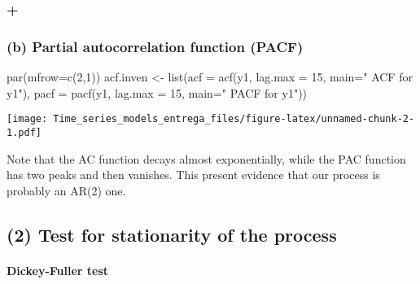 \documentclass[]{article}
\newenvironment{Shaded}{\begin{snugshade}}{\end{snugshade}}
\newcommand{\AttributeTok}[1]{\textcolor[rgb]{0.77,0.63,0.00}{#1}}
\newcommand{\DecValTok}[1]{\textcolor[rgb]{0.00,0.00,0.81}{#1}}
\newcommand{\FunctionTok}[1]{\textcolor[rgb]{0.00,0.00,0.00}{#1}}
\newcommand{\NormalTok}[1]{#1}
\newcommand{\OtherTok}[1]{\textcolor[rgb]{0.56,0.35,0.01}{#1}}
\newcommand{\StringTok}[1]{\textcolor[rgb]{0.31,0.60,0.02}{#1}}
\let\oldparagraph\paragraph
\renewcommand{\paragraph}[1]{\oldparagraph{#1}\mbox{}}
\begin{document}
\hypertarget{section}{%
\subsubsection{+}\label{section}}

\hypertarget{b-partial-autocorrelation-function-pacf}{%
\subsubsection{\texorpdfstring{\textbf{(b)} Partial autocorrelation
function
(PACF)}{(b) Partial autocorrelation function (PACF)}}\label{b-partial-autocorrelation-function-pacf}}

\begin{Shaded}
\begin{Highlighting}[]
\FunctionTok{par}\NormalTok{(}\AttributeTok{mfrow=}\FunctionTok{c}\NormalTok{(}\DecValTok{2}\NormalTok{,}\DecValTok{1}\NormalTok{))}
\NormalTok{acf.inven }\OtherTok{\textless{}{-}} \FunctionTok{list}\NormalTok{(}\StringTok{\textquotesingle{}acf\textquotesingle{}} \OtherTok{=} \FunctionTok{acf}\NormalTok{(y1, }\AttributeTok{lag.max =} \DecValTok{15}\NormalTok{, }\AttributeTok{main=}\StringTok{" ACF for y1"}\NormalTok{),}
                  \StringTok{\textquotesingle{}pacf\textquotesingle{}} \OtherTok{=} \FunctionTok{pacf}\NormalTok{(y1, }\AttributeTok{lag.max =} \DecValTok{15}\NormalTok{, }\AttributeTok{main=}\StringTok{" PACF for y1"}\NormalTok{))}
\end{Highlighting}
\end{Shaded}

\texttt{[image: Time\_series\_models\_entrega\_files/figure-latex/unnamed-chunk-2-1.pdf]}

Note that the AC function decays almost exponentially, while the PAC
function has two peaks and then vanishes. This present evidence that our
process is probably an AR(2) one.

\hypertarget{test-for-stationarity-of-the-process}{%
\subsection{\texorpdfstring{\textbf{(2)} Test for stationarity of the
process}{(2) Test for stationarity of the process}}\label{test-for-stationarity-of-the-process}}

\hypertarget{dickey-fuller-test}{%
\paragraph{Dickey-Fuller test}\label{dickey-fuller-test}}
\end{document}
